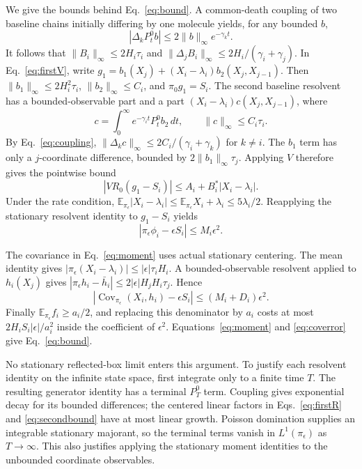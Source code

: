 \documentclass[aps,pre,twocolumn,showpacs,amsmath,amssymb]{revtex4-2}
\begin{document}
We give the bounds behind Eq.~\eqref{eq:bound}. A common-death coupling of two baseline chains initially differing by one molecule yields, for any bounded $b$,
\begin{equation}
|\Delta_kP_t^0b|\leq2\|b\|_\infty e^{-\gamma_kt}.
\label{eq:coupling}
\end{equation}
It follows that $\|B_i\|_\infty\leq2H_i\tau_i$ and $\|\Delta_jB_i\|_\infty\leq2H_i/(\gamma_i+\gamma_j)$. In Eq.~\eqref{eq:firstV}, write $g_1=b_1(X_j)+(X_i-\lambda_i)b_2(X_j,X_{j-1})$. Then $\|b_1\|_\infty\leq2H_i^2\tau_i$, $\|b_2\|_\infty\leq C_i$, and $\pi_0g_1=S_i$. The second baseline resolvent has a bounded-observable part and a part $(X_i-\lambda_i)c(X_j,X_{j-1})$, where
\begin{equation}
c=\int_0^\infty e^{-\gamma_it}P_t^0b_2\,dt,
\qquad \|c\|_\infty\leq C_i\tau_i.
\end{equation}
By Eq.~\eqref{eq:coupling}, $\|\Delta_kc\|_\infty\leq2C_i/(\gamma_i+\gamma_k)$ for $k\ne i$. The $b_1$ term has only a $j$-coordinate difference, bounded by $2\|b_1\|_\infty\tau_j$. Applying $V$ therefore gives the pointwise bound
\begin{equation}
|VR_0(g_1-S_i)|\leq A_i+B_i^*|X_i-\lambda_i|.
\label{eq:secondbound}
\end{equation}
Under the rate condition, $\mathbb E_{\pi_\epsilon}|X_i-\lambda_i|\leq\mathbb E_{\pi_\epsilon}X_i+\lambda_i\leq5\lambda_i/2$. Reapplying the stationary resolvent identity to $g_1-S_i$ yields
\begin{equation}
|\pi_\epsilon\phi_i-\epsilon S_i|\leq M_i\epsilon^2.
\label{eq:phierror}
\end{equation}

The covariance in Eq.~\eqref{eq:moment} uses actual stationary centering. The mean identity gives $|\pi_\epsilon(X_i-\lambda_i)|\leq|\epsilon|\tau_iH_i$. A bounded-observable resolvent applied to $h_i(X_j)$ gives $|\pi_\epsilon h_i-\bar h_i|\leq2|\epsilon|H_jH_i\tau_j$. Hence
\begin{equation}
|\operatorname{Cov}_{\pi_\epsilon}(X_i,h_i)-\epsilon S_i|
\leq(M_i+D_i)\epsilon^2.
\label{eq:coverror}
\end{equation}
Finally $\mathbb E_{\pi_\epsilon}f_i\geq a_i/2$, and replacing this denominator by $a_i$ costs at most $2H_iS_i|\epsilon|/a_i^2$ inside the coefficient of $\epsilon^2$. Equations~\eqref{eq:moment} and \eqref{eq:coverror} give Eq.~\eqref{eq:bound}.

No stationary reflected-box limit enters this argument. To justify each resolvent identity on the infinite state space, first integrate only to a finite time $T$. The resulting generator identity has a terminal $P_T^0$ term. Coupling gives exponential decay for its bounded differences; the centered linear factors in Eqs.~\eqref{eq:firstR} and \eqref{eq:secondbound} have at most linear growth. Poisson domination supplies an integrable stationary majorant, so the terminal terms vanish in $L^1(\pi_\epsilon)$ as $T\to\infty$. This also justifies applying the stationary moment identities to the unbounded coordinate observables.
\end{document}
